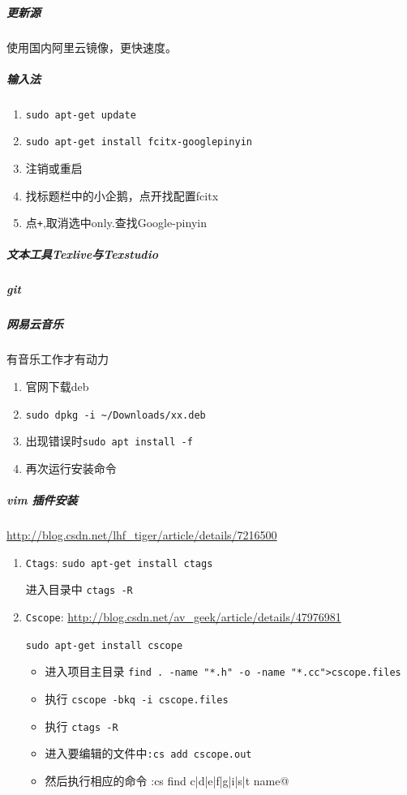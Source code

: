 \documentclass[UTF8,a4paper,12pt]{ctexbook}
\begin{document}
		\subparagraph{更新源}使用国内阿里云镜像，更快速度。

		\subparagraph{输入法}
			\begin{enumerate}[itemindent = 2em]
				\item \verb|sudo apt-get update|
				\item \verb|sudo apt-get install fcitx-googlepinyin|
				\item 注销或重启
				\item 找标题栏中的小企鹅，点开找配置fcitx
				\item 点\verb|+|,取消选中only.查找Google-pinyin
			\end{enumerate}	
					
		\subparagraph{文本工具Texlive与Texstudio}
		
		\subparagraph{git}	
		
		\subparagraph{网易云音乐}有音乐工作才有动力
			\begin{enumerate}[itemindent = 2em]
				\item 官网下载deb
				\item \verb|sudo dpkg -i ~/Downloads/xx.deb|
				\item 出现错误时\verb|sudo apt install -f|
				\item 再次运行安装命令
			\end{enumerate} 
		
		\subparagraph{vim 插件安装}
			\url{http://blog.csdn.net/lhf_tiger/article/details/7216500}
			
			\begin{enumerate}
				\item \verb|Ctags|:
					\verb|sudo apt-get install ctags|
					
					进入目录中
					\verb|ctags -R|
					
					
				\item \verb|Cscope|:
					\url{http://blog.csdn.net/av_geek/article/details/47976981}	
					
					\verb|sudo apt-get install cscope|
					
					\begin{itemize}
						\item 进入项目主目录 \verb|find . -name "*.h" -o -name "*.cc">cscope.files|
						\item 执行 \verb|cscope -bkq -i cscope.files|
						\item 执行 \verb|ctags -R|
						\item 进入要编辑的文件中\verb|:cs add cscope.out|
						\item 然后执行相应的命令 \verb@:cs find c|d|e|f|g|i|s|t name@
					\end{itemize}
			\end{enumerate}
		
\end{document}
